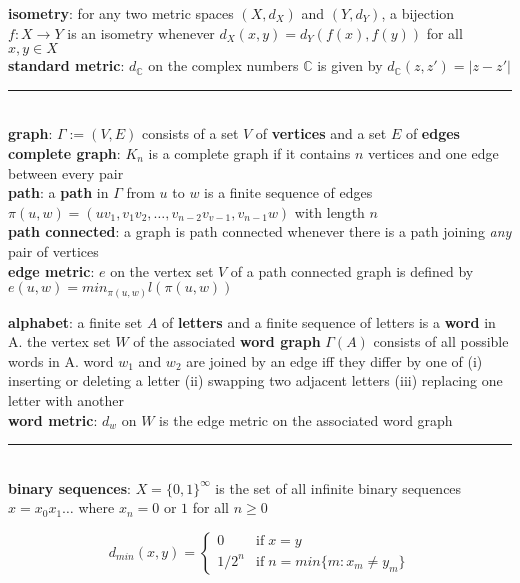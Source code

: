 \documentclass[a4paper]{article}
\newcommand*\abs[1]{\vert #1 \vert}
\newcommand*\linesep[0]{\noindent\rule{\textwidth}{0.5pt}\\}
\begin{document}
\begin{multicols}{2}
\begin{framed}
 	\noindent
 	\textbf{isometry}: for any two metric spaces $(X, d_X)$ and $(Y, d_Y)$, a bijection $f: X \rightarrow Y$ is an isometry whenever $d_X(x, y) = d_Y(f(x), f(y))$ for all $x, y \in X$\\
 	
 	\noindent
 	\textbf{standard metric}: $d_\mathbb{C}$ on the complex numbers $\mathbb{C}$ is given by $d_\mathbb{C}(z, z') = \abs{z - z'}$
 	
 	\linesep
 	\noindent
 	\textbf{graph}: $\Gamma := (V, E)$ consists of a set $V$ of \textbf{vertices} and a set $E$ of \textbf{edges}\\
 	
 	\noindent
 	\textbf{complete graph}: $K_n$ is a complete graph if it contains $n$ vertices and one edge between every pair\\
 	
 	\noindent
 	\textbf{path}: a \textbf{path} in $\Gamma$ from $u$ to $w$ is a finite sequence of edges $\pi(u, w) = (uv_1, v_1v_2, \dots, v_{n-2}v_{v-1}, v_{n-1}w)$ with length $n$\\
 	
 	\noindent
 	\textbf{path connected}: a graph is path connected whenever there is a path joining \textit{any} pair of vertices\\
 	
 	\noindent
 	\textbf{edge metric}: $e$ on the vertex set $V$ of a path connected graph is defined by $e(u, w) = min_{\pi(u, w)} l(\pi(u, w))$
 	\end{framed}
 	
 	\begin{framed}
 	\noindent
 	\textbf{alphabet}: a finite set $A$ of \textbf{letters} and a finite sequence of letters is a \textbf{word} in A. the vertex set $W$ of the associated \textbf{word graph} $\Gamma(A)$ consists of all possible words in A. word $w_1$ and $w_2$ are joined by an edge iff they differ by one of (i) inserting or deleting a letter (ii) swapping two adjacent letters (iii) replacing one letter with another\\
 	
 	\noindent
 	\textbf{word metric}: $d_w$ on $W$ is the edge metric on the associated word graph
 	
 	\linesep
 	\noindent
 	\textbf{binary sequences}: $X = \{0, 1\}^\infty$ is the set of all infinite binary sequences $x = x_0x_1\dots$ where $x_n = 0$ or $1$ for all $n \geq 0$
 	 
 	\[ d_{min}(x, y) = \begin{cases} 
      0 & \text{if} \; x = y \\
      1/2^n & \text{if} \; n = min\{m : x_m \neq y_m\}
      \end{cases}
	\]
	

\end{framed}
\end{multicols}
\end{document}
